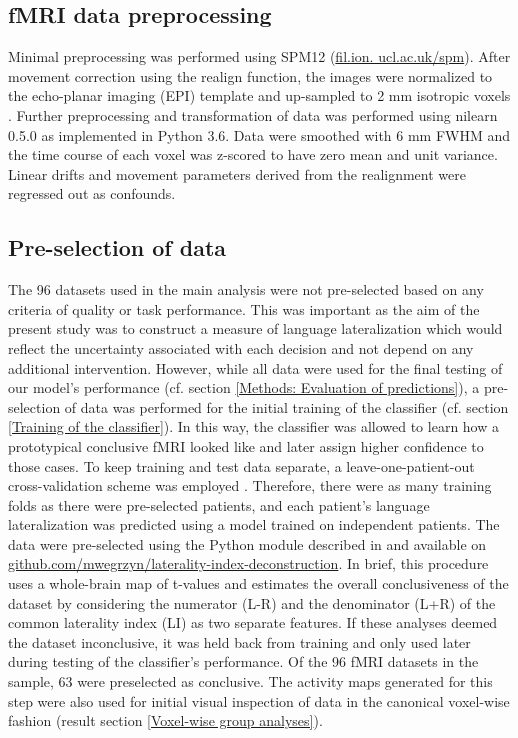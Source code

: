 \documentclass[fleqn,10pt]{SelfArx} %
\begin{document}
\subsection{fMRI data preprocessing} \label{fMRI data preprocessing}
Minimal preprocessing was performed using SPM12 (\href{https://www.fil.ion.ucl.ac.uk/spm/}{fil.ion. ucl.ac.uk/spm}). After movement correction using the realign function, the images were normalized to the echo-planar imaging (EPI) template and up-sampled to 2 mm isotropic voxels \citep{Calhoun_2017}. Further preprocessing and transformation of data was performed using nilearn 0.5.0 as implemented in Python 3.6. Data were smoothed with 6 mm FWHM and the time course of each voxel was z-scored to have zero mean and unit variance. Linear drifts and movement parameters derived from the realignment were regressed out as confounds.

\subsection{Pre-selection of data} \label{Pre-selection of data}
The 96 datasets used in the main analysis were not pre-selected based on any criteria of quality or task performance. This was important as the aim of the present study was to construct a measure of language lateralization which would reflect the uncertainty associated with each decision and not depend on any additional intervention. However, while all data were used for the final testing of our model’s performance (cf. section \ref{Methods: Evaluation of predictions}), a pre-selection of data was performed for the initial training of the classifier (cf. section \ref{Training of the classifier}). In this way, the classifier was allowed to learn how a prototypical conclusive fMRI looked like and later assign higher confidence to those cases. To keep training and test data separate, a leave-one-patient-out cross-validation scheme was employed \citep{Esterman_2010}. Therefore, there were as many training folds as there were pre-selected patients, and each patient's language lateralization was predicted using a model trained on independent patients. The data were pre-selected using the Python module described in \citet{Wegrzyn_2019} and available on \href{https://github.com/mwegrzyn/laterality-index-deconstruction}{github.com/mwegrzyn/laterality-index-deconstruction}. In brief, this procedure uses a whole-brain map of t-values and estimates the overall conclusiveness of the dataset by considering the numerator (L-R) and the denominator (L+R) of the common laterality index (LI) as two separate features. If these analyses deemed the dataset inconclusive, it was held back from training and only used later during testing of the classifier’s performance. Of the 96 fMRI datasets in the sample, 63 were preselected as conclusive. The activity maps generated for this step were also used for initial visual inspection of data in the canonical voxel-wise fashion (result section \ref{Voxel-wise group analyses}).
\end{document}
